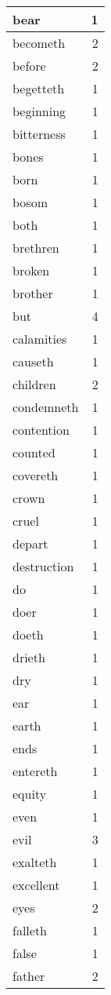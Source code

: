 \begin{center}
\begin{longtable}{l|r}
bear & 1\\ \hline 
becometh & 2\\ \hline 
before & 2\\ \hline 
begetteth & 1\\ \hline 
beginning & 1\\ \hline 
bitterness & 1\\ \hline 
bones & 1\\ \hline 
born & 1\\ \hline 
bosom & 1\\ \hline 
both & 1\\ \hline 
brethren & 1\\ \hline 
broken & 1\\ \hline 
brother & 1\\ \hline 
but & 4\\ \hline 
calamities & 1\\ \hline 
causeth & 1\\ \hline 
children & 2\\ \hline 
condemneth & 1\\ \hline 
contention & 1\\ \hline 
counted & 1\\ \hline 
covereth & 1\\ \hline 
crown & 1\\ \hline 
cruel & 1\\ \hline 
depart & 1\\ \hline 
destruction & 1\\ \hline 
do & 1\\ \hline 
doer & 1\\ \hline 
doeth & 1\\ \hline 
drieth & 1\\ \hline 
dry & 1\\ \hline 
ear & 1\\ \hline 
earth & 1\\ \hline 
ends & 1\\ \hline 
entereth & 1\\ \hline 
equity & 1\\ \hline 
even & 1\\ \hline 
evil & 3\\ \hline 
exalteth & 1\\ \hline 
excellent & 1\\ \hline 
eyes & 2\\ \hline 
falleth & 1\\ \hline 
false & 1\\ \hline 
father & 2\\ \hline 

\end{longtable}
\end{center}
